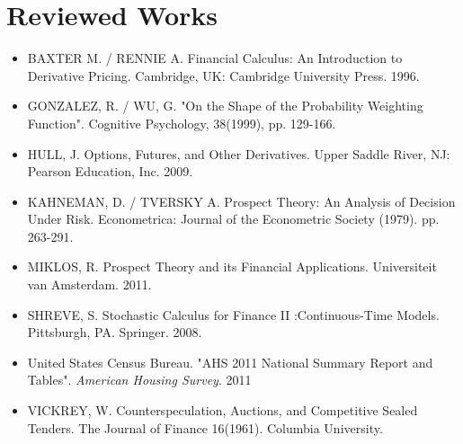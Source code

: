 \documentclass[twoside]{article}
\begin{document}
\newpage

\section{Reviewed Works}
\begin{itemize}
\item{BAXTER M. / RENNIE A. Financial Calculus: An Introduction to Derivative Pricing. Cambridge, UK: Cambridge University Press. 1996.}
\item{GONZALEZ, R. / WU, G. "On the Shape of the Probability Weighting Function". Cognitive Psychology, 38(1999), pp. 129-166. }
\item{HULL, J. Options, Futures, and Other Derivatives. Upper Saddle River, NJ: Pearson Education, Inc. 2009.}
\item{KAHNEMAN, D. /  TVERSKY A. Prospect Theory: An Analysis of Decision Under Risk. Econometrica: Journal of the Econometric Society (1979). pp. 263-291.}
\item{MIKLOS, R. Prospect Theory and its Financial Applications. Universiteit van Amsterdam. 2011.}
\item{SHREVE, S. Stochastic Calculus for Finance II :Continuous-Time Models. Pittsburgh, PA. Springer. 2008.}
\item{United States Census Bureau. "AHS 2011 National Summary Report and Tables". \emph{American Housing Survey}. 2011 }
\item{VICKREY, W. Counterspeculation, Auctions, and Competitive Sealed Tenders. The Journal of Finance 16(1961). Columbia University.}
\end{itemize}

 


\newpage
\end{document}

